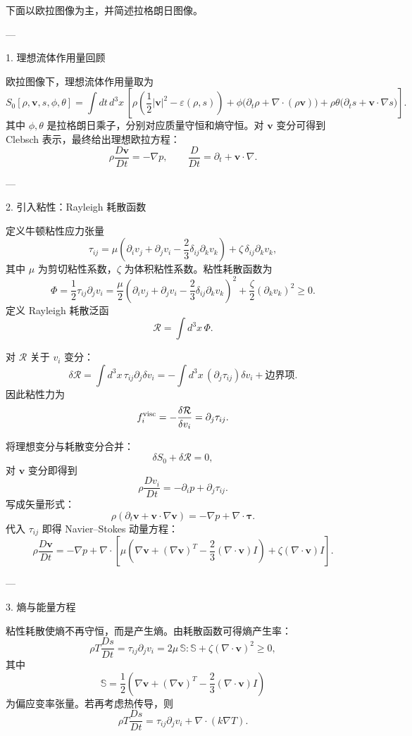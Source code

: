 \documentclass[b5paper]{book}
\begin{document}
下面以欧拉图像为主，并简述拉格朗日图像。

---

 1. 理想流体作用量回顾

欧拉图像下，理想流体作用量取为
\[
S_0[\rho,\mathbf v,s,\phi,\theta]
=
\int dt\,d^3x\,
\left[
\rho\left(\frac12|\mathbf v|^2-\varepsilon(\rho,s)\right)
+\phi\bigl(\partial_t\rho+\nabla\cdot(\rho\mathbf v)\bigr)
+\rho\theta\bigl(\partial_t s+\mathbf v\cdot\nabla s\bigr)
\right].
\]
其中 \(\phi,\theta\) 是拉格朗日乘子，分别对应质量守恒和熵守恒。对 \(\mathbf v\) 变分可得到 Clebsch 表示，最终给出理想欧拉方程：
\[
\rho\frac{D\mathbf v}{Dt}=-\nabla p,
\qquad
\frac{D}{Dt}=\partial_t+\mathbf v\cdot\nabla.
\]

---

 2. 引入粘性：Rayleigh 耗散函数

定义牛顿粘性应力张量
\[
\tau_{ij}
=
\mu\left(\partial_i v_j+\partial_j v_i-\frac23\delta_{ij}\partial_k v_k\right)
+\zeta\,\delta_{ij}\partial_k v_k,
\]
其中 \(\mu\) 为剪切粘性系数，\(\zeta\) 为体积粘性系数。粘性耗散函数为
\[
\Phi=\frac12\tau_{ij}\partial_j v_i
=
\frac{\mu}{2}\left(\partial_i v_j+\partial_j v_i-\frac23\delta_{ij}\partial_k v_k\right)^2
+\frac{\zeta}{2}(\partial_k v_k)^2\ge 0.
\]
定义 Rayleigh 耗散泛函
\[
\mathcal R=\int d^3x\,\Phi.
\]

对 \(\mathcal R\) 关于 \(v_i\) 变分：
\[
\delta \mathcal R
=
\int d^3x\,\tau_{ij}\partial_j\delta v_i
=
-\int d^3x\,(\partial_j\tau_{ij})\delta v_i
+\text{边界项}.
\]
因此粘性力为
\[
f_i^{\rm visc}=-\frac{\delta \mathcal R}{\delta v_i}=\partial_j\tau_{ij}.
\]

将理想变分与耗散变分合并：
\[
\delta S_0+\delta \mathcal R=0,
\]
对 \(\mathbf v\) 变分即得到
\[
\rho\frac{D v_i}{Dt}=-\partial_i p+\partial_j\tau_{ij}.
\]
写成矢量形式：
\[
\boxed{
\rho\left(\partial_t\mathbf v+\mathbf v\cdot\nabla\mathbf v\right)
=-\nabla p+\nabla\cdot\boldsymbol\tau.
}
\]
代入 \(\tau_{ij}\) 即得 Navier–Stokes 动量方程：
\[
\rho\frac{D\mathbf v}{Dt}
=
-\nabla p
+\nabla\cdot\left[
\mu\left(\nabla\mathbf v+(\nabla\mathbf v)^T-\frac23(\nabla\cdot\mathbf v)I\right)
+\zeta(\nabla\cdot\mathbf v)I
\right].
\]

---

 3. 熵与能量方程

粘性耗散使熵不再守恒，而是产生熵。由耗散函数可得熵产生率：
\[
\rho T\frac{Ds}{Dt}
=
\tau_{ij}\partial_j v_i
=
2\mu\,\mathbb S:\mathbb S+\zeta(\nabla\cdot\mathbf v)^2\ge 0,
\]
其中
\[
\mathbb S=\frac12\left(\nabla\mathbf v+(\nabla\mathbf v)^T-\frac23(\nabla\cdot\mathbf v)I\right)
\]
为偏应变率张量。若再考虑热传导，则
\[
\rho T\frac{Ds}{Dt}
=
\tau_{ij}\partial_j v_i+\nabla\cdot(k\nabla T).
\]
\end{document}
